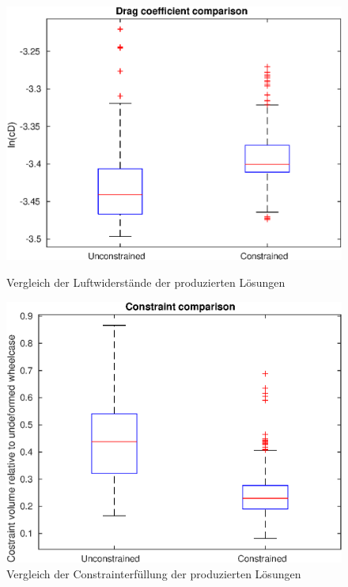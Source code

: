 \begin{figure}[h]
	\centering
	\begin{minipage}{0.45\textwidth}
		\centering
		\includegraphics[width=1\linewidth]{bilder/6pt500Samples/dragBoxplot}
		\caption{Vergleich der Luftwiderstände der produzierten Lösungen}
		\label{fig:2nddragbox}
	\end{minipage}\hfill
	\begin{minipage}{0.45\textwidth}
		\centering
		\includegraphics[width=1\linewidth]{bilder/6pt500Samples/constraintBoxplot}
		\caption{Vergleich der Constrainterfüllung der produzierten Lösungen}
		\label{fig:2ndconbox}
	\end{minipage}
\end{figure}

